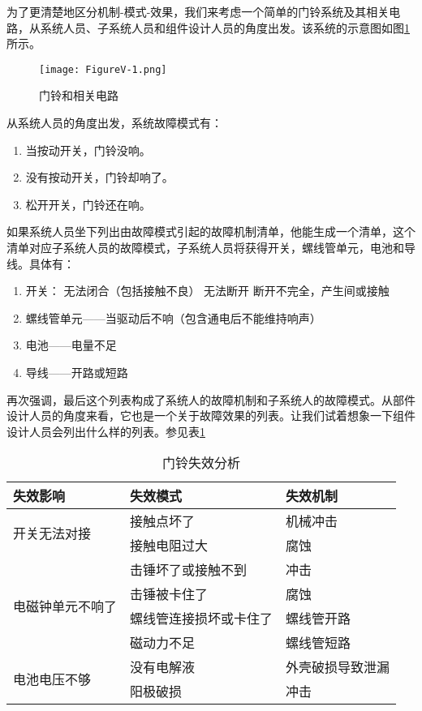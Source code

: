 \documentclass[cn,11pt,chinese]{elegantbook}
\begin{document}
为了更清楚地区分机制-模式-效果，我们来考虑一个简单的门铃系统及其相关电路，从系统人员、子系统人员和组件设计人员的角度出发。该系统的示意图如图\ref{fig:fig5_1} 所示。

\begin{figure}[h]
	\centering
	\texttt{[image: FigureV-1.png]}
	\caption{门铃和相关电路}\label{fig:fig5_1}
\end{figure}

从系统人员的角度出发，系统故障模式有：

\begin{enumerate}
	\item 当按动开关，门铃没响。
	\item 没有按动开关，门铃却响了。
	\item 松开开关，门铃还在响。
\end{enumerate}

如果系统人员坐下列出由故障模式引起的故障机制清单，他能生成一个清单，这个清单对应子系统人员的故障模式，子系统人员将获得开关，螺线管单元，电池和导线。具体有：


\begin{enumerate}
	\item 开关：
		\subitem 无法闭合（包括接触不良）
		\subitem 无法断开
		\subitem 断开不完全，产生间或接触
	\item 螺线管单元——当驱动后不响（包含通电后不能维持响声）
	\item 电池——电量不足
	\item 导线——开路或短路
\end{enumerate}


再次强调，最后这个列表构成了系统人的故障机制和子系统人的故障模式。从部件设计人员的角度来看，它也是一个关于故障效果的列表。让我们试着想象一下组件设计人员会列出什么样的列表。参见表\ref{tab:tab4_3}

\begin{table}[htpb]
	\centering
	\caption{门铃失效分析}
	\label{tab:tab4_3}
	\begin{tabular}{@{}lll@{}}
		\toprule
		失效影响                      & 失效模式        & 失效机制     \\ \midrule
		\multirow{2}{*}{开关无法对接}   & 接触点坏了       & 机械冲击     \\
		& 接触电阻过大      & 腐蚀       \\ \hline
		\multirow{4}{*}{电磁钟单元不响了} & 击锤坏了或接触不到   & 冲击       \\
		& 击锤被卡住了      & 腐蚀       \\
		& 螺线管连接损坏或卡住了 & 螺线管开路    \\
		& 磁动力不足       & 螺线管短路    \\ \hline
		\multirow{2}{*}{电池电压不够}   & 没有电解液       & 外壳破损导致泄漏 \\
		& 阳极破损        & 冲击       \\ \bottomrule
	\end{tabular}
\end{table}
\end{document}
